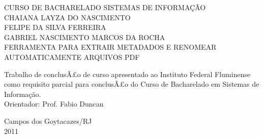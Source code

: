 \begin{titlepage}
 \begin{figure}[ht]
 \centering
 \end{figure}
 \begin{center}
   {\large CURSO DE BACHARELADO SISTEMAS DE INFORMAÇÃO} \\ [3.5cm]
   {\large CHAIANA LAYZA DO NASCIMENTO} \\
   {\large FELIPE DA SILVA FERREIRA} \\
   {\large GABRIEL NASCIMENTO MARCOS DA ROCHA} \\ [4cm]
   {\large FERRAMENTA PARA EXTRAIR METADADOS E RENOMEAR AUTOMATICAMENTE ARQUIVOS PDF}\\ [2cm]
   \hspace{.45\textwidth} %
   \begin{minipage}{0.5\textwidth}
   \begin{espacosimples}
        Trabalho de conclusÃ£o de curso apresentado ao Instituto Federal Fluminense como requisito parcial para conclusÃ£o do Curso de Bacharelado em Sistemas de Informação.\\[1.5cm]
        Orientador: Prof. Fabio Duncan
    \end{espacosimples}
    \end{minipage}
   \vfill
   {\large Campos dos Goytacazes/RJ} \\
   {\large 2011}
 \end{center}
\end{titlepage}
